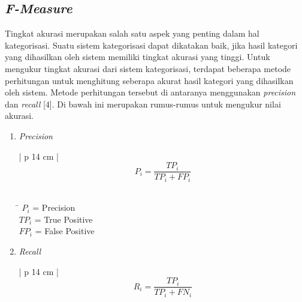 {\subsection{{\itshape F-Measure}}
\indent
Tingkat akurasi merupakan salah satu aspek yang penting dalam hal kategorisasi. Suatu sistem kategorisasi dapat dikatakan baik, jika hasil kategori yang dihasilkan oleh sistem memiliki tingkat akurasi yang tinggi. Untuk mengukur tingkat akurasi dari sistem kategorisasi, terdapat beberapa metode perhitungan untuk menghitung seberapa akurat hasil kategori yang dihasilkan oleh sistem. Metode perhitungan tersebut di antaranya menggunakan {\itshape precision} dan {\itshape recall} [4]. Di bawah ini merupakan rumus-rumus untuk mengukur nilai akurasi.

\begin{enumerate}[nolistsep,leftmargin=0.5cm]
\item 
{\itshape Precision}

\begin{table}[H]
\small
\centering
\begin{adjustbox}{width=1\textwidth}
\begin{tabular}{| p {14 cm} |}
\hline
{}
\begin{equation}
P_i = \dfrac{TP_i}{TP_i + FP_i}
\end{equation}\\
\hline
\end{tabular}
\end{adjustbox}
\end{table}

\begin{tabbing}[H]
\= \kill
\small{\hspace{60mm}$P_i$ = Precision}\\
\small{\hspace{60mm}$TP_i$ = True Positive}\\
\small{\hspace{60mm}$FP_i$ = False Positive}
\end{tabbing}

\item
{\itshape Recall}

\begin{table}[H]
\small
\centering
\begin{adjustbox}{width=1\textwidth}
\begin{tabular}{| p {14 cm} |}
\hline
{}
\begin{equation}
R_i = \dfrac{TP_i}{TP_i + FN_i}
\end{equation}\\
\hline
\end{tabular}
\end{adjustbox}
\end{table}


\end{enumerate}}
